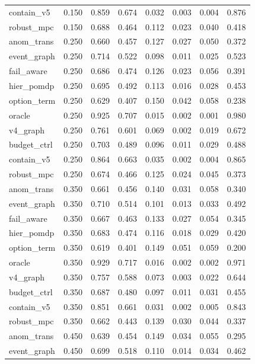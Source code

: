 \documentclass{article}
\begin{document}
\begin{longtable}{@{}lrrrrrrr@{}}
contain\_v5 & 0.150 & 0.859 & 0.674 & 0.032 & 0.003 & 0.004 & 0.876 \\
robust\_mpc & 0.150 & 0.688 & 0.464 & 0.112 & 0.023 & 0.040 & 0.418 \\
anom\_trans & 0.250 & 0.660 & 0.457 & 0.127 & 0.027 & 0.050 & 0.372 \\
event\_graph & 0.250 & 0.714 & 0.522 & 0.098 & 0.011 & 0.025 & 0.523 \\
fail\_aware & 0.250 & 0.686 & 0.474 & 0.126 & 0.023 & 0.056 & 0.391 \\
hier\_pomdp & 0.250 & 0.695 & 0.492 & 0.113 & 0.016 & 0.028 & 0.453 \\
option\_term & 0.250 & 0.629 & 0.407 & 0.150 & 0.042 & 0.058 & 0.238 \\
oracle & 0.250 & 0.925 & 0.707 & 0.015 & 0.002 & 0.001 & 0.980 \\
v4\_graph & 0.250 & 0.761 & 0.601 & 0.069 & 0.002 & 0.019 & 0.672 \\
budget\_ctrl & 0.250 & 0.703 & 0.489 & 0.096 & 0.011 & 0.029 & 0.488 \\
contain\_v5 & 0.250 & 0.864 & 0.663 & 0.035 & 0.002 & 0.004 & 0.865 \\
robust\_mpc & 0.250 & 0.674 & 0.466 & 0.125 & 0.024 & 0.045 & 0.373 \\
anom\_trans & 0.350 & 0.661 & 0.456 & 0.140 & 0.031 & 0.058 & 0.340 \\
event\_graph & 0.350 & 0.710 & 0.514 & 0.101 & 0.013 & 0.033 & 0.492 \\
fail\_aware & 0.350 & 0.667 & 0.463 & 0.133 & 0.027 & 0.054 & 0.345 \\
hier\_pomdp & 0.350 & 0.683 & 0.474 & 0.116 & 0.018 & 0.029 & 0.420 \\
option\_term & 0.350 & 0.619 & 0.401 & 0.149 & 0.051 & 0.059 & 0.200 \\
oracle & 0.350 & 0.929 & 0.717 & 0.016 & 0.002 & 0.002 & 0.971 \\
v4\_graph & 0.350 & 0.757 & 0.588 & 0.073 & 0.003 & 0.022 & 0.644 \\
budget\_ctrl & 0.350 & 0.687 & 0.480 & 0.097 & 0.011 & 0.031 & 0.455 \\
contain\_v5 & 0.350 & 0.851 & 0.661 & 0.031 & 0.002 & 0.005 & 0.843 \\
robust\_mpc & 0.350 & 0.662 & 0.443 & 0.139 & 0.030 & 0.044 & 0.337 \\
anom\_trans & 0.450 & 0.639 & 0.454 & 0.149 & 0.034 & 0.055 & 0.295 \\
event\_graph & 0.450 & 0.699 & 0.518 & 0.110 & 0.014 & 0.034 & 0.462 \\

\end{longtable}
\end{document}
